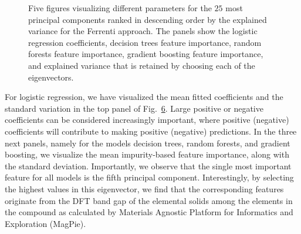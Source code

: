 \documentclass[superscriptaddress,unsortedaddress,
 amsmath,amssymb,
 aps,
]{revtex4-2}
\begin{document}
\begin{figure}[ht!]
  \begin{subfigure}[b]{0.5\textwidth}
    \centering
    
    \label{fig:01-fi-a}
  \end{subfigure}%

  \begin{subfigure}[b]{0.5\textwidth}
    \centering
    
    \label{fig:01-fi-b}
  \end{subfigure}%

  \begin{subfigure}[b]{0.5\textwidth}
    \centering
    
    \label{fig:01-fi-c}
  \end{subfigure}%

  \begin{subfigure}[b]{0.5\textwidth}
    \centering
    
    \label{fig:01-fi-d}
  \end{subfigure}%

  \begin{subfigure}[b]{0.5\textwidth}
    \centering
    
    \label{fig:01-fi-e}
  \end{subfigure}%

  \caption{Five figures visualizing different parameters for the $25$ most principal components ranked in descending order by the explained variance for the Ferrenti approach. The panels show the logistic regression coefficients, decision trees feature importance, random forests feature importance, gradient boosting feature importance, and explained variance that is retained by choosing each of the eigenvectors. }
  \label{fig:01-fi}
\end{figure}


For logistic regression, we have visualized the mean fitted coefficients and the standard variation in the top panel of Fig.~\ref{fig:01-fi}. Large positive or negative coefficients can be considered increasingly important, where positive (negative) coefficients will contribute to making positive (negative) predictions. In the three next panels, namely for the models decision trees, random forests, and gradient boosting, we visualize the mean impurity-based feature importance, along with the standard deviation. Importantly, we observe that the single most important feature for all models is the fifth principal component. Interestingly, by selecting the highest values in this eigenvector, we find that the corresponding features originate from the DFT band gap of the elemental solids among the elements in the 
compound 
as calculated by Materials Agnostic Platform for Informatics and Exploration (MagPie). 
\end{document}
